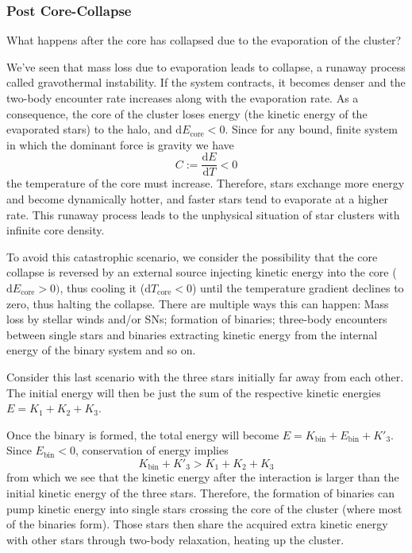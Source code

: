 \subsubsection*{Post Core-Collapse}
What happens after the core has collapsed due to the evaporation of the cluster?
\par We've seen that mass loss due to evaporation leads to collapse, a runaway process called gravothermal instability. If the system contracts, it becomes denser and the two-body encounter rate increases along with the evaporation rate. As a consequence, the core of the cluster loses energy (the kinetic energy of the evaporated stars) to the halo, and $\text{d}E_{\text{core}}<0$. Since for any bound, ﬁnite system in which the dominant force is gravity we have
\begin{equation*}
    C := \frac{\text{d}E}{\text{d}T} < 0
\end{equation*}
the temperature of the core must increase. Therefore, stars exchange more energy and become dynamically hotter, and faster stars tend to evaporate at a higher rate. This runaway process leads to the unphysical situation of star clusters with inﬁnite core density.
\par To avoid this catastrophic scenario, we consider the possibility that the core collapse is reversed by an external source injecting kinetic energy into the core ($\text{d}E_{\text{core}} > 0)$, thus cooling it ($\text{d}T_{\text{core}} < 0$) until the temperature gradient declines to zero, thus halting the collapse. There are multiple ways this can happen: Mass loss by stellar winds and/or SNs; formation of binaries; three-body encounters between single stars and binaries extracting kinetic energy from the internal energy of the binary system and so on.
\par Consider this last scenario with the three stars initially far away from each other. The initial energy will then be just the sum of the respective kinetic energies $E = K_{1}+K_{2}+K_{3}$.
\par Once the binary is formed, the total energy will become $E = K_{\text{bin}}+E_{\text{bin}}+K'_{3}$. Since $E_{\text{bin}}<0$, conservation of energy implies
\begin{equation*}
    K_{\text{bin}}+K'_{3} > K_{1}+K_{2}+K_{3}
\end{equation*}
from which we see that the kinetic energy after the interaction is larger than the initial kinetic energy of the three stars. Therefore, the formation of binaries can pump kinetic energy into single stars crossing the core of the cluster (where most of the binaries form). Those stars then share the acquired extra kinetic energy with other stars through two-body relaxation, heating up the cluster.
